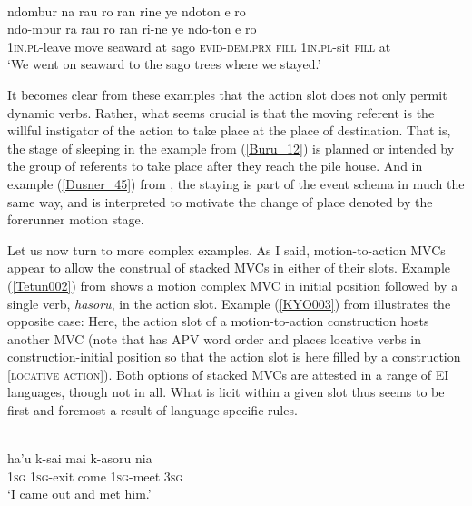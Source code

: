 \ea \label{Dusner_45}
\\
\glll ndombur na rau ro ran rine ye ndoton e ro \\
ndo-mbur ra rau ro ran ri-ne ye ndo-ton e ro \\
1\textsc{in}.\textsc{pl}-leave move seaward at sago \textsc{evid}-\textsc{dem}.\textsc{prx} \textsc{fill} 1\textsc{in}.\textsc{pl}-sit \textsc{fill} at \\
\glft `We went on seaward to the sago trees where we stayed.'\\ 
\z

It becomes clear from these examples that the action slot does not only permit dynamic verbs. Rather, what seems crucial is that the moving referent is the willful instigator of the action to take place at the place of destination. That is, the stage of sleeping in the  example from (\ref{Buru_12}) is planned or intended by the group of referents to take place after they reach the pile house. And in example (\ref{Dusner_45}) from , the staying is part of the event schema in much the same way, and is interpreted to motivate the change of place denoted by the forerunner motion stage.

Let us now turn to more complex examples. As I said, motion-to-action MVCs appear to allow the construal of stacked MVCs in either of their slots. Example (\ref{Tetun002}) from  shows a motion complex MVC in initial position followed by a single verb, \textit{hasoru}, in the action slot. Example (\ref{KYO003}) from  illustrates the opposite case: Here, the action slot of a motion-to-action construction hosts another MVC (note that  has APV word order and places locative verbs in construction-initial position so that the action slot is here filled by a construction [\textsc{locative} \textsc{action}]). Both options of stacked MVCs are attested in a range of EI languages, though not in all. What is licit within a given slot thus seems to be first and foremost a result of language-specific rules.

\ea \label{Tetun002}
\\
\gll ha'u k-sai mai k-asoru nia \\
\textsc{1}\textsc{sg} \textsc{1}\textsc{sg}-exit come \textsc{1}\textsc{sg}-meet \textsc{3}\textsc{sg} \\
\glft `I came out and met him.'\\ 
\z

